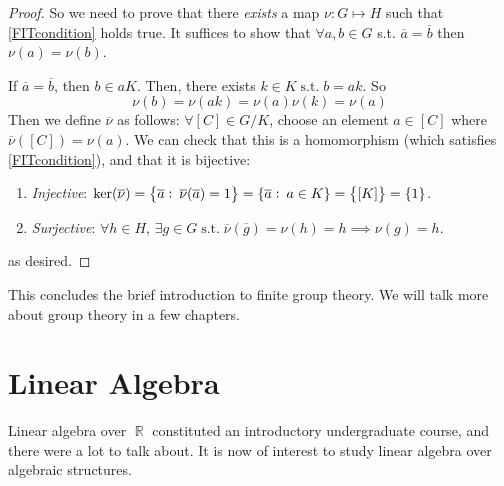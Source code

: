 \documentclass[11pt]{amsart} %
\theoremstyle{definition}
\theoremstyle{definition}
\DeclareMathOperator{\R}{\mathbb{R}}
\DeclareMathOperator{\suchthat}{\text{ s.t. }}
\numberwithin{equation}{section}
\newcommand{\condset}[4]{\left\{ #1  : \: #2 #3 #4 \right\}}
\begin{document}
\begin{proof}
	So we need to prove that there \textit{exists} a map $\nu : G \mapsto H$ such that \eqref{FITcondition} holds true. It suffices to show that $\forall a,b \in G$ s.t. $\overline{a} = \overline{b }$ then $\nu (a) = \nu (b) $.
	
	If $\overline{a} = \overline{ b}$, then $b \in aK$. Then, there exists $k \in K \suchthat b = ak$. So
	$$\nu (b) = \nu (ak) = \nu (a) \nu (k) = \nu (a)$$
	Then we define $\overline{\nu }$ as follows: $\forall [C] \in G/K$, choose an element $a \in [C]$ where $\overline{\nu} ([C]) = \nu (a)$. We can check that this is a homomorphism (which satisfies \eqref{FITcondition}), and that it is bijective:
	\begin{enumerate}[  label=(\alph*)]
		\item \textit{Injective}: $\ker (\overline{\nu}) = \condset{ \overline{a} }{ \overline{\nu } (\overline{a})  }{  = }{1} = \condset{ \overline{a}}{ a}{ \in}{ K } = \set{ [K] } = \{1\}$.
		\item \textit{Surjective}: $\forall h \in H$, $\exists g \in G \suchthat \overline{ \nu } (\overline{ g }) = \nu (h) = h \implies \nu (g) = h$.
	\end{enumerate}	
	as desired.
\end{proof}

This concludes the brief introduction to finite group theory. We will talk more about group theory in a few chapters.


\clearpage 

\section{Linear Algebra}

Linear algebra over $\R$ constituted an introductory undergraduate course, and there were a lot to talk about. It is now of interest to study linear algebra over algebraic structures.
\end{document}
